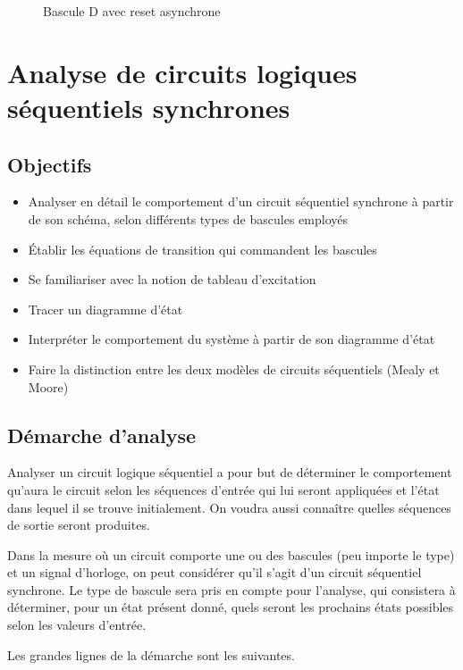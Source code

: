 \documentclass[11pt]{article}
\begin{document}
\begin{figure}[htbp]
\centering

\caption{\label{fig:orgad66e8a}Bascule D avec reset asynchrone}
\end{figure}

\section{Analyse de circuits logiques séquentiels synchrones}
\label{sec:org5c4d279}
\subsection{Objectifs}
\label{sec:org299bd82}
\begin{itemize}
\item Analyser en détail le comportement d'un circuit séquentiel
synchrone à partir de son schéma, selon différents types de bascules
employés
\item Établir les équations de transition qui commandent les bascules
\item Se familiariser avec la notion de tableau d'excitation
\item Tracer un diagramme d'état
\item Interpréter le comportement du système à partir de son
diagramme d'état
\item Faire la distinction entre les deux modèles de circuits séquentiels
(Mealy et Moore)
\end{itemize}

\subsection{Démarche d'analyse}
\label{sec:org6e584e9}

Analyser un circuit logique séquentiel a pour but de déterminer le
comportement qu'aura le circuit selon les séquences d'entrée qui lui
seront appliquées et l'état dans lequel il se trouve initialement. On
voudra aussi connaître quelles séquences de sortie seront produites.

Dans la mesure où un circuit comporte une ou des bascules (peu importe
le type) et un signal d'horloge, on peut considérer qu'il s'agit d'un
circuit séquentiel synchrone. Le type de bascule sera pris en compte
pour l'analyse, qui consistera à déterminer, pour un état présent
donné, quels seront les prochains états possibles selon les valeurs
d'entrée.

Les grandes lignes de la démarche sont les suivantes.
\end{document}
